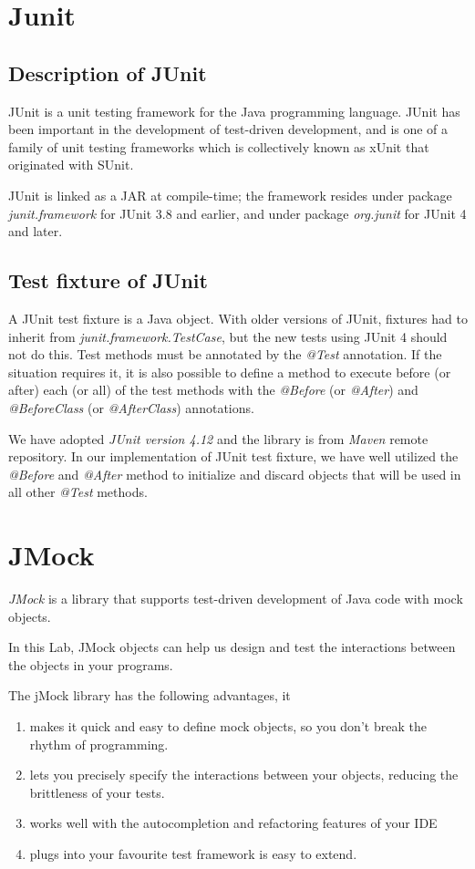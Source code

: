 \documentclass[./report.tex]{subfiles}
\begin{document}
\section{Junit}
\subsection{Description of JUnit}
\par JUnit is a unit testing framework for the Java programming language. JUnit has been important in the development of test-driven development, and is one of a family of unit testing frameworks which is collectively known as xUnit that originated with SUnit.
\par JUnit is linked as a JAR at compile-time; the framework resides under package \emph{ junit.framework} for JUnit 3.8 and earlier, and under package \emph{org.junit} for JUnit 4 and later.
\subsection{Test fixture of JUnit}
A JUnit test fixture is a Java object. With older versions of JUnit, fixtures had to inherit from \emph{junit.framework.TestCase}, but the new tests using JUnit 4 should not do this. Test methods must be annotated by the \emph{@Test} annotation. If the situation requires it, it is also possible to define a method to execute before (or after) each (or all) of the test methods with the \emph{@Before} (or \emph{@After}) and \emph{@BeforeClass} (or \emph{@AfterClass}) annotations.
\par
We have adopted \emph{JUnit version 4.12} and the library is from \emph{Maven} remote repository. In our implementation of JUnit test fixture, we  have well utilized the  \emph{@Before} and \emph{@After} method to initialize and discard objects that will be used in all other \emph{@Test} methods.
\section{JMock}
\par \emph{JMock} is a library that supports test-driven development of Java code with mock objects.
\par In this Lab, JMock objects can help us design and test the interactions between the objects in your programs.

\par The jMock library has the following advantages, it
\begin{enumerate} 
\item makes it quick and easy to define mock objects, so you don't break the rhythm of programming.
\item lets you precisely specify the interactions between your objects, reducing the brittleness of your tests.
\item works well with the autocompletion and refactoring features of your IDE
\item plugs into your favourite test framework is easy to extend.
\end{enumerate}
\end{document}
